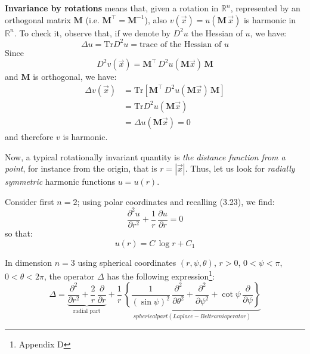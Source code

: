 \documentclass[../main.tex]{subfiles}
\begin{document}
\textbf{Invariance by rotations} means that, given a rotation in $\mathbb{R}^n$, represented by an orthogonal matrix $\mathbf{M}$ (i.e. $\mathbf{M}^{\top} = \mathbf{M}^{−1}$), also $v(\vec{x}) = u(\mathbf{M} \, \vec{x})$ is harmonic in $\mathbb{R}^n$. To check it, observe that, if we denote by $D^2 u$ the Hessian of $u$, we have:
\begin{equation} \label{eq:LE50}
    \Delta u = \mathrm{Tr} D^2 u = \text{trace of the Hessian of $u$}
\end{equation}
Since
\begin{equation} \label{eq:LE51}
    D^2 v(\vec{x}) = \mathbf{M}^{\top} \, D^2 u(\mathbf{M} \vec{x}) \, \mathbf{M}
\end{equation}
and $\mathbf{M}$ is orthogonal, we have:
\begin{align}
    \Delta v(\vec{x}) &= \mathrm{Tr}[\mathbf{M}^{\top} \, D^2 u(\mathbf{M} \vec{x}) \, \mathbf{M}]  \nonumber \\
    &= \mathrm{Tr} D^2 u(\mathbf{M} \vec{x})  \nonumber \\
    &= \Delta u(\mathbf{M} \vec{x}) = 0 \label{eq:LE52}
\end{align}
and therefore $v$ is harmonic.

Now, a typical rotationally invariant quantity is \textit{the distance function from a point}, for instance from the origin, that is $r = |\vec{x}|$. Thus, let us look for \textit{radially symmetric} harmonic functions $u = u(r)$.

Consider first $n = 2$; using polar coordinates and recalling (3.23), we find:
\begin{equation} \label{eq:LE53}
    \frac{\partial^2 u}{\partial r^2} + \frac{1}{r} \, \frac{\partial u}{\partial r} = 0
\end{equation}
so that:
\begin{equation} \label{eq:LE54}
    u(r) = C \, \log{r} + C_1
\end{equation}

In dimension $n = 3$ using spherical coordinates $(r, \psi, \theta)$, $r > 0$, $0 < \psi < \pi$, $0 < \theta < 2 \pi$, the operator $\Delta$ has the following expression\footnote{Appendix D}:
\begin{equation} \label{eq:LE55}
    \Delta = \underbrace{\frac{\partial^2}{\partial r^2} + \frac{2}{r} \, \frac{\partial}{\partial r}}_{\text{radial part}} + \frac{1}{r} \, \underbrace{\left\{\frac{1}{(\sin{\psi})^2} \, \frac{\partial^2}{\partial \theta^2} + \frac{\partial^2}{\partial \psi^2} + \cot{\psi} \, \frac{\partial}{\partial \psi}\right\}}_{spherical part (Laplace-Beltrami operator)}
\end{equation}
\end{document}
